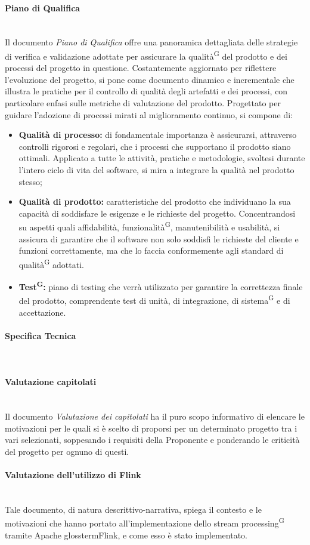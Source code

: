 \documentclass[8pt]{article}
\newcommand{\glossterm}[1]{#1\textsuperscript{G}} %
\newcommand{\subsubsubsection}[1]{\paragraph{#1}\mbox{}\\}
\begin{document}
\subsubsubsection{Piano di Qualifica}
Il documento \textit{Piano di Qualifica} offre una panoramica dettagliata delle strategie di verifica e validazione adottate per assicurare la \glossterm{qualità} del prodotto e dei processi del progetto in questione. Costantemente aggiornato per riflettere l'evoluzione del progetto, si pone come documento dinamico e incrementale che illustra le pratiche per il controllo di qualità degli artefatti e dei processi, con particolare enfasi sulle metriche di valutazione del prodotto. Progettato per guidare l'adozione di processi mirati al miglioramento continuo, si compone di:
\begin{itemize}
    \item \textbf{Qualità di processo:} di fondamentale importanza è assicurarsi, attraverso controlli rigorosi e regolari, che i processi che supportano il prodotto siano ottimali. Applicato a tutte le attività, pratiche e metodologie, svoltesi durante l'intero ciclo di vita del software, si mira a integrare la qualità nel prodotto stesso;
    \item \textbf{Qualità di prodotto:} caratteristiche del prodotto che individuano la sua capacità di soddisfare le esigenze e le richieste del progetto. Concentrandosi su aspetti quali affidabilità, \glossterm{funzionalità}, manutenibilità e usabilità, si assicura di garantire che il software non solo soddisfi le richieste del cliente e funzioni correttamente, ma che lo faccia conformemente agli standard di \glossterm{qualità} adottati.
    \item \textbf{\glossterm{Test}:} piano di testing che verrà utilizzato per garantire la correttezza finale del prodotto, comprendente test di unità, di integrazione, di \glossterm{sistema} e di accettazione.
\end{itemize} 

\subsubsubsection{Specifica Tecnica}
%
%
%

\subsubsubsection{Valutazione capitolati}
Il documento \textit{Valutazione dei capitolati} ha il puro scopo informativo di elencare le
motivazioni per le quali si è scelto di proporsi per un determinato progetto tra i vari selezionati,
soppesando i requisiti della Proponente e ponderando le criticità del progetto per ognuno di questi.  

\subsubsubsection{Valutazione dell'utilizzo di Flink}
Tale documento, di natura descrittivo-narrativa, spiega il contesto e le motivazioni che hanno portato all'implementazione dello \glossterm{stream processing} tramite Apache glossterm{Flink}, e come esso è stato implementato.
\end{document}
